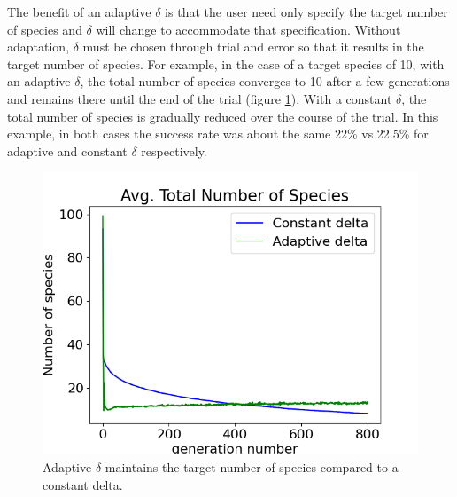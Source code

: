 \documentclass[12pt]{report}
\begin{document}
The benefit of an adaptive $\delta$ is that the user need only specify the target number of species and $\delta$ will change to accommodate that specification. Without adaptation, $\delta$ must be chosen through trial and error so that it results in the target number of species. For example, in the case of a target species of 10, with an adaptive $\delta$, the total number of species converges to 10 after a few generations and remains there until the end of the trial (figure \ref{fig:adaptive_delta}). With a constant $\delta$, the total number of species is gradually reduced over the course of the trial. In this example, in both cases the success rate was about the same 22\% vs 22.5\% for adaptive and constant $\delta$ respectively. 

\begin{figure}
\centering
    \includegraphics[width=15cm]{images/adaptive_delta.png}
    \caption[Adaptive $\delta$ maintains the target number of species]{Adaptive $\delta$ maintains the target number of species compared to a constant delta.}
    \label{fig:adaptive_delta}
\end{figure}
\end{document}
